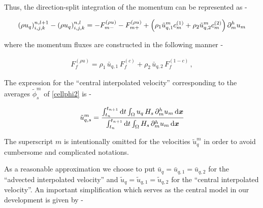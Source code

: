 Thus, the direction-split integration of the momentum can be represented as - 


\begin{align}
{(\rho u_{q})_{i,j,k}^{n,l+1} - (\rho u_{q})_{i,j,k}^{n,l}}  = - F^{(\rho u)}_{m-} - F^{(\rho u)}_{m+}
 + \Big( \rho_1 \tilde u_{q,1}^m  c^{(1)}_m +  \rho_2 \tilde u_{q,2}^m c^{(2)}_m 
 \Big) \, \partial_{m}^h u_m 
\label{sumfrou}
\end{align}


where the momentum fluxes are constructed in the following manner -


\begin{align}
 F^{(\rho u)}_{f} =  \rho_1 \,\bar u_{q,1}  \,F^{(c)}_{f}  +  
 \rho_2 \,\bar u_{q,2}  \,F^{(1-c)}_{f} \,,
\end{align}


The expression for the ``central interpolated velocity'' corresponding to the 
averages $\tilde \phi_s^m$ of \eqref{cellphi2} is -  



\begin{align}
	\tilde u_{q,s}^{m} = \frac{\int_{t_n}^{t_{n+1}} {\textrm{d}}t \int_{\Omega} u_q \, H_s \,  
	\partial_{m}^h u_m   \,  {\textrm{d}}\boldsymbol{x}}
	{\int_{t_n}^{t_{n+1}} {\textrm{d}}t \int_{\Omega} H_s \, \partial_{m}^h u_m \,{\textrm{d}}\boldsymbol{x}} 
\label{tildeudef}
\end{align}


The superscript $m$ is intentionally omitted  
for the velocities $\tilde u_q^m$ in order to avoid
cumbersome and complicated notations. 


As a reasonable approximation we choose to put 
$\bar u_q =  \bar u_{q,1} = \bar u_{q,2}$ for the 
``advected interpolated velocity'' and 
$\tilde u_q =  \tilde u_{q,1} = \tilde u_{q,2}$
for the ``central interpolated  velocity''. 
An important simplification which serves as  
the central model in our development is given by -  



